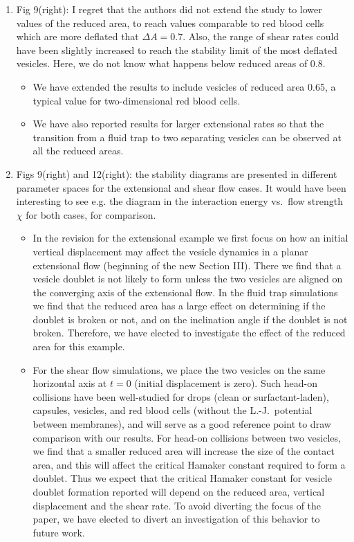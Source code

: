 \documentclass[11pt]{article}
\newcommand{\comment}[1]{{\color{blue} #1}}
\begin{document}
\begin{enumerate}
\item\comment{Fig 9(right): I regret that the authors did not extend the
  study to lower values of the reduced area, to reach values comparable
  to red blood cells which are more deflated that $\Delta A=0.7$. Also,
  the range of shear rates could have been slightly increased to reach
  the stability limit of the most deflated vesicles. Here, we do not
  know what happens below reduced areas of 0.8.}
\begin{itemize}
  \item We have extended the results to include vesicles of reduced area
    0.65, a typical value for two-dimensional red blood cells.
  \item We have also reported results for larger extensional rates so
    that the transition from a fluid trap to two separating vesicles can
    be observed at all the reduced areas.
\end{itemize}

\item\comment{Figs 9(right) and 12(right): the stability diagrams are
  presented in different parameter spaces for the extensional and shear
  flow cases. It would have been interesting to see e.g. the diagram in
  the interaction energy vs.~flow strength $\chi$ for both cases, for
  comparison.}
\begin{itemize}
  \item In the revision for the extensional example we first focus on
    how an initial vertical displacement may affect the vesicle dynamics
    in a planar extensional flow (beginning of the new Section III).
    There we find that a vesicle doublet is not likely to form unless
    the two vesicles are aligned on the converging axis of the
    extensional flow. In the fluid trap simulations we find that the
    reduced area has a large effect on determining if the doublet is
    broken or not, and on the inclination angle if the doublet is not
    broken.  Therefore, we have elected to investigate the effect of the
    reduced area for this example.

  \item For the shear flow simulations, we place the two vesicles on the
    same horizontal axis at $t=0$ (initial displacement is zero).  Such
    head-on collisions have been well-studied for drops (clean or
    surfactant-laden), capsules, vesicles, and red blood cells (without
    the L.-J.~potential between membranes), and will serve as a good
    reference point to draw comparison with our results. For head-on
    collisions between two vesicles, we find that  a smaller reduced
    area will increase the size of the contact area, and this will
    affect the critical Hamaker constant required to form a doublet.
    Thus we expect that the critical Hamaker constant for vesicle
    doublet formation reported will depend on the reduced area, vertical
    displacement and the shear rate.  To avoid diverting the focus of
    the paper, we have elected to divert an investigation of this
    behavior to future work.
\end{itemize}


\end{enumerate}
\end{document}
